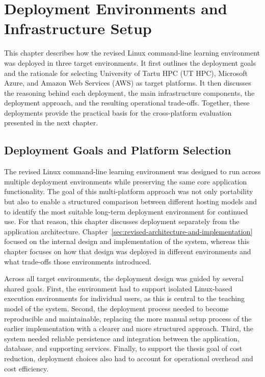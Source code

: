 \section{Deployment Environments and Infrastructure Setup} \label{sec:deployment-environments-and-infrastructure-setup}
This chapter describes how the revised Linux command-line learning environment was deployed in three target environments.
It first outlines the deployment goals and the rationale for selecting University of Tartu HPC (UT HPC), Microsoft Azure, and Amazon Web Services (AWS) as target platforms.
It then discusses the reasoning behind each deployment, the main infrastructure components, the deployment approach, and the resulting operational trade-offs.
Together, these deployments provide the practical basis for the cross-platform evaluation presented in the next chapter.

\subsection{Deployment Goals and Platform Selection} \label{subsec:deployment-goals-and-platform-selection}
The revised Linux command-line learning environment was designed to run across multiple deployment environments while preserving the same core application functionality.
The goal of this multi-platform approach was not only portability but also to enable a structured comparison between different hosting models and to identify the most suitable long-term deployment environment for continued use.
For that reason, this chapter discusses deployment separately from the application architecture.
Chapter~\ref{sec:revised-architecture-and-implementation} focused on the internal design and implementation of the system, whereas this chapter focuses on how that design was deployed in different environments and what trade-offs those environments introduced.

Across all target environments, the deployment design was guided by several shared goals.
First, the environment had to support isolated Linux-based execution environments for individual users, as this is central to the teaching model of the system.
Second, the deployment process needed to become reproducible and maintainable, replacing the more manual setup process of the earlier implementation with a clearer and more structured approach.
Third, the system needed reliable persistence and integration between the application, database, and supporting services.
Finally, to support the thesis goal of cost reduction, deployment choices also had to account for operational overhead and cost efficiency.

